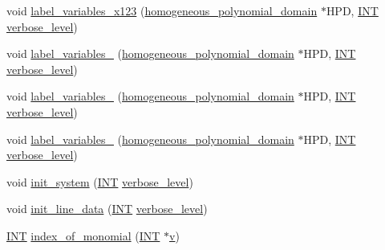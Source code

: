 \begin{DoxyCompactItemize}
\item 
void \mbox{\hyperlink{classsurface_a65aacff743fcb36c0457fc936edfabd2}{label\+\_\+variables\+\_\+x123}} (\mbox{\hyperlink{classhomogeneous__polynomial__domain}{homogeneous\+\_\+polynomial\+\_\+domain}} $\ast$H\+PD, \mbox{\hyperlink{galois_8h_a09fddde158a3a20bd2dcadb609de11dc}{I\+NT}} \mbox{\hyperlink{simeon_8_c_a818073fbcc2f439e7c56952f67386122}{verbose\+\_\+level}})
\item 
void \mbox{\hyperlink{classsurface_a84f8ff28e4d214a8ead89e25e623df3f}{label\+\_\+variables\+\_}} (\mbox{\hyperlink{classhomogeneous__polynomial__domain}{homogeneous\+\_\+polynomial\+\_\+domain}} $\ast$H\+PD, \mbox{\hyperlink{galois_8h_a09fddde158a3a20bd2dcadb609de11dc}{I\+NT}} \mbox{\hyperlink{simeon_8_c_a818073fbcc2f439e7c56952f67386122}{verbose\+\_\+level}})
\item 
void \mbox{\hyperlink{classsurface_a060c114ceb886a5218fc1bb3ff39aeda}{label\+\_\+variables\+\_}} (\mbox{\hyperlink{classhomogeneous__polynomial__domain}{homogeneous\+\_\+polynomial\+\_\+domain}} $\ast$H\+PD, \mbox{\hyperlink{galois_8h_a09fddde158a3a20bd2dcadb609de11dc}{I\+NT}} \mbox{\hyperlink{simeon_8_c_a818073fbcc2f439e7c56952f67386122}{verbose\+\_\+level}})
\item 
void \mbox{\hyperlink{classsurface_ac29ccad78752c1f010b5991b5f4c5209}{label\+\_\+variables\+\_}} (\mbox{\hyperlink{classhomogeneous__polynomial__domain}{homogeneous\+\_\+polynomial\+\_\+domain}} $\ast$H\+PD, \mbox{\hyperlink{galois_8h_a09fddde158a3a20bd2dcadb609de11dc}{I\+NT}} \mbox{\hyperlink{simeon_8_c_a818073fbcc2f439e7c56952f67386122}{verbose\+\_\+level}})
\item 
void \mbox{\hyperlink{classsurface_a7fbcf60eff1b8fcf85459e8ee821fe36}{init\+\_\+system}} (\mbox{\hyperlink{galois_8h_a09fddde158a3a20bd2dcadb609de11dc}{I\+NT}} \mbox{\hyperlink{simeon_8_c_a818073fbcc2f439e7c56952f67386122}{verbose\+\_\+level}})
\item 
void \mbox{\hyperlink{classsurface_a2d9e24e666ca96960e7215f759e899de}{init\+\_\+line\+\_\+data}} (\mbox{\hyperlink{galois_8h_a09fddde158a3a20bd2dcadb609de11dc}{I\+NT}} \mbox{\hyperlink{simeon_8_c_a818073fbcc2f439e7c56952f67386122}{verbose\+\_\+level}})
\item 
\mbox{\hyperlink{galois_8h_a09fddde158a3a20bd2dcadb609de11dc}{I\+NT}} \mbox{\hyperlink{classsurface_a121f8ba1f05712475aa758f7152f4ce5}{index\+\_\+of\+\_\+monomial}} (\mbox{\hyperlink{galois_8h_a09fddde158a3a20bd2dcadb609de11dc}{I\+NT}} $\ast$\mbox{\hyperlink{classsurface_a954b79421836692cdd415861d7b6398c}{v}})

\end{DoxyCompactItemize}
